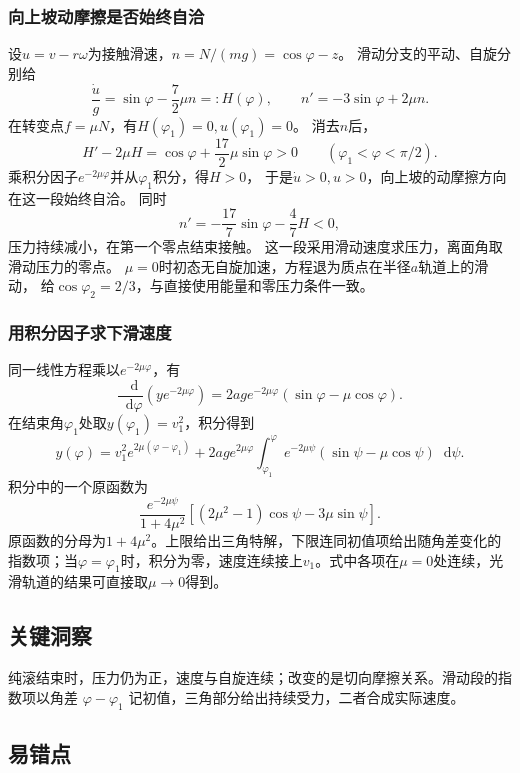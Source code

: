 \documentclass[UTF8,fontset=fandol,a4paper,11pt]{ctexart}
\newcommand{\dd}{\mathop{}\!\mathrm{d}}
\begin{document}
\subsubsection*{向上坡动摩擦是否始终自洽}
设$u=v-r\omega$为接触滑速，$n=N/(mg)=\cos\varphi-z$。
滑动分支的平动、自旋分别给
\[
\frac{\dot u}{g}=\sin\varphi-\frac72\mu n=:H(\varphi),
\qquad n'=-3\sin\varphi+2\mu n.
\]
在转变点$f=\mu N$，有$H(\varphi_1)=0,u(\varphi_1)=0$。
消去$n$后，
\[
H'-2\mu H=\cos\varphi+\frac{17}{2}\mu\sin\varphi>0
\qquad(\varphi_1<\varphi<\pi/2).
\]
乘积分因子$e^{-2\mu\varphi}$并从$\varphi_1$积分，得$H>0$，
于是$\dot u>0,u>0$，向上坡的动摩擦方向在这一段始终自洽。
同时
\[
n'=-\frac{17}{7}\sin\varphi-\frac47H<0,
\]
压力持续减小，在第一个零点结束接触。
这一段采用滑动速度求压力，离面角取滑动压力的零点。
$\mu=0$时初态无自旋加速，方程退为质点在半径$a$轨道上的滑动，
给$\cos\varphi_2=2/3$，与直接使用能量和零压力条件一致。
\subsubsection*{用积分因子求下滑速度}
同一线性方程乘以$e^{-2\mu\varphi}$，有
\[
\frac{\dd}{\dd\varphi}\left(ye^{-2\mu\varphi}\right)
=2ag e^{-2\mu\varphi}(\sin\varphi-\mu\cos\varphi).
\]
在结束角$\varphi_1$处取$y(\varphi_1)=v_1^2$，积分得到
\[
y(\varphi)=v_1^2 e^{2\mu(\varphi-\varphi_1)}
+2ag e^{2\mu\varphi}\int_{\varphi_1}^{\varphi}
e^{-2\mu\psi}(\sin\psi-\mu\cos\psi)\dd\psi.
\]
积分中的一个原函数为
\[
\frac{e^{-2\mu\psi}}{1+4\mu^2}
[(2\mu^2-1)\cos\psi-3\mu\sin\psi].
\]
原函数的分母为$1+4\mu^2$。上限给出三角特解，下限连同初值项给出随角差变化的指数项；当$\varphi=\varphi_1$时，积分为零，速度连续接上$v_1$。式中各项在$\mu=0$处连续，光滑轨道的结果可直接取$\mu\to0$得到。





\subsection*{关键洞察}

纯滚结束时，压力仍为正，速度与自旋连续；改变的是切向摩擦关系。滑动段的指数项以角差 $\varphi-\varphi_1$ 记初值，三角部分给出持续受力，二者合成实际速度。



\subsection*{易错点}
\end{document}

